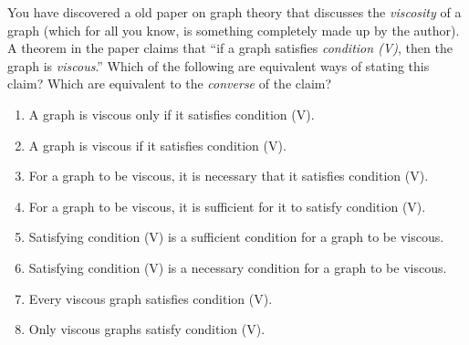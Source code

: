 \documentclass[11pt,]{book}
\theoremstyle{ptxplainnotitle}
\theoremstyle{ptxplaintitle}
\theoremstyle{ptxdefinitionnotitle}
\theoremstyle{ptxdefinitiontitle}
\theoremstyle{ptxdefinitionnotitle}
\theoremstyle{ptxdefinitiontitle}
\theoremstyle{ptxdefinitionnotitle}
\theoremstyle{ptxdefinitiontitle}
\theoremstyle{ptxdefinitiontitlenonumber}
\theoremstyle{ptxdefinitiontitlenonumber}
\numberwithin{equation}{chapter}
\begin{document}
\begin{divisionexercise}{6}\hypertarget{exercise-155}{}
\hypertarget{p-2047}{}%
You have discovered a old paper on graph theory that discusses the \emph{viscosity} of a graph (which for all you know, is something completely made up by the author).  A theorem in the paper claims that ``if a graph satisfies \emph{condition (V)}, then the graph is \emph{viscous}.''  Which of the following are equivalent ways of stating this claim?  Which are equivalent to the \emph{converse} of the claim? \leavevmode%
\begin{enumerate}[label=(\alph*)]
\item\hypertarget{li-981}{}\hypertarget{p-2048}{}%
A graph is viscous only if it satisfies condition (V). %
\item\hypertarget{li-986}{}\hypertarget{p-2053}{}%
A graph is viscous if it satisfies condition (V). %
\item\hypertarget{li-991}{}\hypertarget{p-2058}{}%
For a graph to be viscous, it is necessary that it satisfies condition (V). %
\item\hypertarget{li-996}{}\hypertarget{p-2063}{}%
For a graph to be viscous, it is sufficient for it to satisfy condition (V). %
\item\hypertarget{li-1001}{}\hypertarget{p-2068}{}%
Satisfying condition (V) is a sufficient condition for a graph to be viscous. %
\item\hypertarget{li-1006}{}\hypertarget{p-2073}{}%
Satisfying condition (V) is a necessary condition for a graph to be viscous. %
\item\hypertarget{li-1011}{}\hypertarget{p-2078}{}%
Every viscous graph satisfies condition (V). %
\item\hypertarget{li-1016}{}\hypertarget{p-2083}{}%
Only viscous graphs satisfy condition (V). %
\end{enumerate}
%
\end{divisionexercise}%
\end{document}
